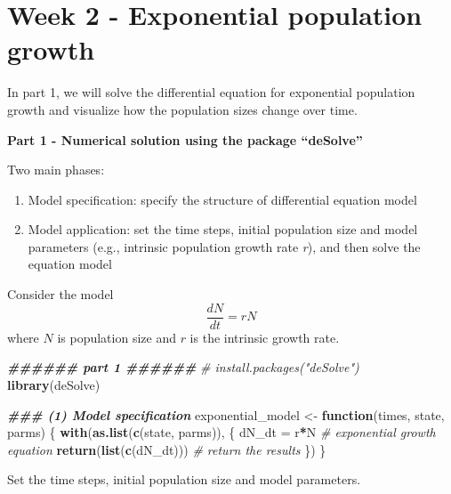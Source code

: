 \documentclass[
]{book}
\newenvironment{Shaded}{\begin{snugshade}}{\end{snugshade}}
\newcommand{\CommentTok}[1]{\textcolor[rgb]{0.56,0.35,0.01}{\textit{#1}}}
\newcommand{\ControlFlowTok}[1]{\textcolor[rgb]{0.13,0.29,0.53}{\textbf{#1}}}
\newcommand{\DocumentationTok}[1]{\textcolor[rgb]{0.56,0.35,0.01}{\textbf{\textit{#1}}}}
\newcommand{\FunctionTok}[1]{\textcolor[rgb]{0.13,0.29,0.53}{\textbf{#1}}}
\newcommand{\NormalTok}[1]{#1}
\newcommand{\OtherTok}[1]{\textcolor[rgb]{0.56,0.35,0.01}{#1}}
\newcommand{\SpecialCharTok}[1]{\textcolor[rgb]{0.81,0.36,0.00}{\textbf{#1}}}
\begin{document}
\hypertarget{week-2---exponential-population-growth}{%
\chapter*{Week 2 - Exponential population growth}\label{week-2---exponential-population-growth}}

In part 1, we will solve the differential equation for exponential population growth and visualize how the population sizes change over time.

\textbf{Part 1 - Numerical solution using the package ``deSolve''}

Two main phases:

\begin{enumerate}
\def\labelenumi{(\arabic{enumi})}
\item
  Model specification: specify the structure of differential equation model
\item
  Model application: set the time steps, initial population size and model parameters (e.g., intrinsic population growth rate \emph{r}), and then solve the equation model
\end{enumerate}

Consider the model
\[
\frac{dN}{dt} = rN
\]
where \(N\) is population size and \(r\) is the intrinsic growth rate.

\begin{Shaded}
\begin{Highlighting}[]
\DocumentationTok{\#\#\#\#\#\# part 1 \#\#\#\#\#\#}
\CommentTok{\# install.packages("deSolve")}
\FunctionTok{library}\NormalTok{(deSolve)}

\DocumentationTok{\#\#\# (1) Model specification}
\NormalTok{exponential\_model }\OtherTok{\textless{}{-}} \ControlFlowTok{function}\NormalTok{(times, state, parms) \{}
  \FunctionTok{with}\NormalTok{(}\FunctionTok{as.list}\NormalTok{(}\FunctionTok{c}\NormalTok{(state, parms)), \{}
\NormalTok{    dN\_dt }\OtherTok{=}\NormalTok{ r}\SpecialCharTok{*}\NormalTok{N  }\CommentTok{\# exponential growth equation}
    \FunctionTok{return}\NormalTok{(}\FunctionTok{list}\NormalTok{(}\FunctionTok{c}\NormalTok{(dN\_dt)))  }\CommentTok{\# return the results}
\NormalTok{  \})}
\NormalTok{\}}
\end{Highlighting}
\end{Shaded}

Set the time steps, initial population size and model parameters.
\end{document}
